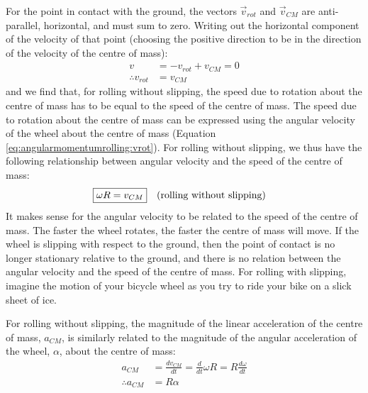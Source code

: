 For the point in contact with the ground, the vectors $\vec v_{rot}$ and $\vec v_{CM}$ are anti-parallel, horizontal, and must sum to zero. Writing out the horizontal component of the velocity of that point (choosing the positive direction to be in the direction of the velocity of the centre of mass):
\begin{align*}
v &= -v_{rot} + v_{CM} = 0\\
\therefore v_{rot} &= v_{CM}
\end{align*}
and we find that, for rolling without slipping, the speed due to rotation about the centre of mass has to be equal to the speed of the centre of mass. The speed due to rotation about the centre of mass can be expressed using the angular velocity of the wheel about the centre of mass (Equation \ref{eq:angularmomentumrolling:vrot}). For rolling without slipping, we thus have the following relationship between angular velocity and the speed of the centre of mass:
\begin{align}
\Aboxed{\omega R &= v_{CM}}\quad \text{(rolling without slipping)}
\end{align}
It makes sense for the angular velocity to be related to the speed of the centre of mass. The faster the wheel rotates, the faster the centre of mass will move. If the wheel is slipping with respect to the ground, then the point of contact is no longer stationary relative to the ground, and there is no relation between the angular velocity and the speed of the centre of mass. For rolling with slipping, imagine the motion of your bicycle wheel as you try to ride your bike on a slick sheet of ice.

For rolling without slipping, the magnitude of the linear acceleration of the centre of mass, $a_{CM}$, is similarly related to the magnitude of the angular acceleration of the wheel, $\alpha$, about the centre of mass:
\begin{align*}
a_{CM} &= \frac{dv_{CM}}{dt} = \frac{d}{dt}\omega R = R \frac{d\omega}{dt}\\
\therefore a_{CM} &= R\alpha
\end{align*}

